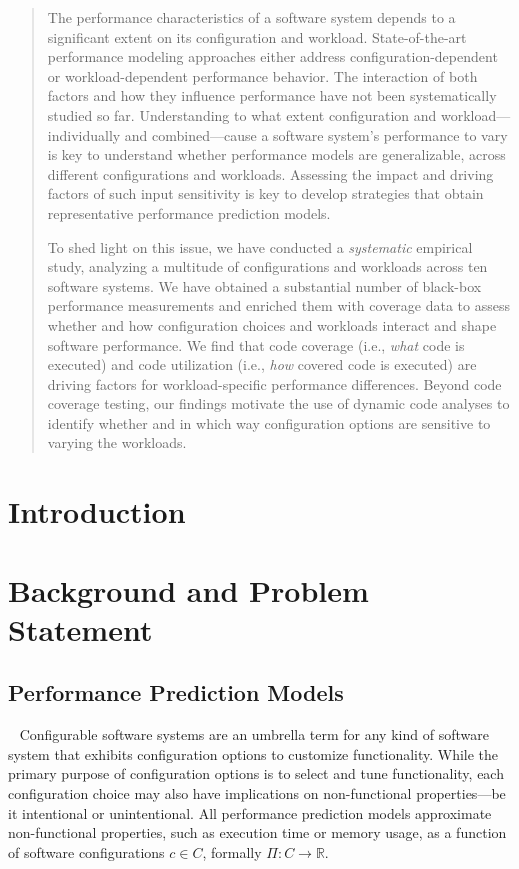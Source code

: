 \begin{abstract}
	The performance characteristics of a software system depends to a significant extent on its configuration and workload. State-of-the-art performance modeling approaches either address configuration-dependent or workload-dependent performance behavior.  The interaction of both factors and how they influence performance have not been systematically studied so far. Understanding to what extent configuration and workload---individually and combined---cause a software system’s performance to vary is key to understand whether performance models are generalizable, across different configurations and workloads. Assessing the impact and driving factors of such input sensitivity is key to develop strategies that obtain representative performance prediction models.
	
	To shed light on this issue, we have conducted a \emph{systematic} empirical study, analyzing a multitude of configurations and workloads across ten software systems. We have obtained a substantial number of black-box performance measurements and enriched them with coverage data to assess whether and how configuration choices and workloads interact and shape software performance. 
	We find that code coverage (i.e., \textit{what} code is executed) and code utilization (i.e., \textit{how} covered code is executed) are driving factors for workload-specific performance differences. Beyond code coverage testing, our findings motivate the use of dynamic code analyses to identify whether and in which way configuration options are sensitive to varying the workloads.
\end{abstract}

\section{Introduction}


\section{Background and Problem Statement}
\subsection{Performance Prediction Models}~\label{sec:perfmodels}
Configurable software systems are an umbrella term for any kind of software system that exhibits configuration options to customize functionality. While the primary purpose of configuration options is to select and tune functionality, each configuration choice may also have implications on non-functional properties---be it intentional or unintentional. 
All performance prediction models approximate non-functional properties, such as execution time or memory usage, as a function of software configurations $c \in C$, formally $\Pi: C \rightarrow \mathbb{R}$. 

